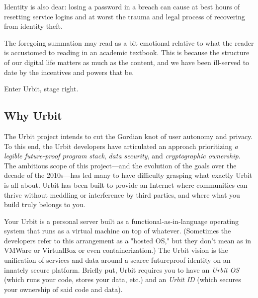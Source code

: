 Identity is also dear:  losing a password in a breach can cause at best hours of resetting service logins and at worst the trauma and legal process of recovering from identity theft.

The foregoing summation may read as a bit emotional relative to what the reader is accustomed to reading in an academic textbook.  This is because the structure of our digital life matters as much as the content, and we have been ill-served to date by the incentives and powers that be.

Enter Urbit, stage right.

\subsection{Why Urbit}

The Urbit project intends to cut the Gordian knot of user autonomy and privacy.  To this end, the Urbit developers have articulated an approach prioritizing \emph{a legible future-proof program stack}, \emph{data security}, and \emph{cryptographic ownership}.  The ambitious scope of this project—and the evolution of the goals over the decade of the 2010s—has led many to have difficulty grasping what exactly Urbit is all about.  Urbit has been built to provide an Internet where communities can thrive without meddling or interference by third parties, and where what you build truly belongs to you.

Your Urbit is a personal server built as a functional-as-in-language operating system that runs as a virtual machine on top of whatever.  (Sometimes the developers refer to this arrangement as a "hosted OS," but they don't mean as in VMWare or VirtualBox or even containerization.)  The Urbit vision is the unification of services and data around a scarce futureproof identity on an innately secure platform.  Briefly put, Urbit requires you to have an \emph{Urbit OS} (which runs your code, stores your data, etc.) and an \emph{Urbit ID} (which secures your ownership of said code and data).

